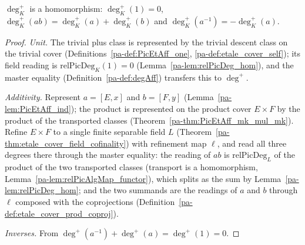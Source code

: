 \begin{theorem}
  \label{pa-thm:degAff_hom}
  \leanok

  \(\deg^{+}_K\) is a homomorphism: \(\deg^{+}_K(1) = 0\),
  \(\deg^{+}_K(a b) = \deg^{+}_K(a) + \deg^{+}_K(b)\) and
  \(\deg^{+}_K(a^{-1}) = -\deg^{+}_K(a)\).
\end{theorem}
\begin{proof}
  \leanok
  \emph{Unit.} The trivial plus class is represented by the trivial descent class on the
  trivial cover (Definitions~\ref{pa-def:PicEtAff_one}, \ref{pa-def:etale_cover_self}); its field
  reading is \(\mathrm{relPicDeg}_K(1) = 0\) (Lemma~\ref{pa-lem:relPicDeg_hom}), and the master
  equality (Definition~\ref{pa-def:degAff}) transfers this to \(\deg^{+}\).

  \emph{Additivity.} Represent \(a = [E,x]\) and \(b = [F,y]\)
  (Lemma~\ref{pa-lem:PicEtAff_ind}); the product is represented on the product cover
  \(E \times F\) by the product of the transported classes
  (Theorem~\ref{pa-thm:PicEtAff_mk_mul_mk}). Refine \(E \times F\) to a single finite separable
  field \(L\) (Theorem~\ref{pa-thm:etale_cover_field_cofinality}) with refinement map \(\ell\),
  and read all three degrees there through the master equality: the reading of \(ab\) is
  \(\mathrm{relPicDeg}_L\) of the product of the two transported classes (transport is a
  homomorphism, Lemma~\ref{pa-lem:relPicAlgMap_functor}), which splits as the sum by
  Lemma~\ref{pa-lem:relPicDeg_hom}; and the two summands are the readings of \(a\) and \(b\)
  through \(\ell\) composed with the coprojections
  (Definition~\ref{pa-def:etale_cover_prod_coproj}).

  \emph{Inverses.} From \(\deg^{+}(a^{-1}) + \deg^{+}(a) = \deg^{+}(1) = 0\).
\end{proof}


